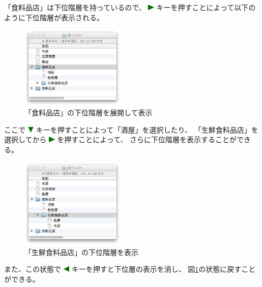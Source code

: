 \documentclass[twoside]{wiss}
\def\figwidth{50mm}
\def\downtriangle{ \includegraphics[width=3mm,bb=0 0 36 36]{figures/downtriangle.pdf} }
\def\righttriangle{ \includegraphics[width=3mm,bb=0 0 36 36]{figures/righttriangle.pdf} }
\def\lefttriangle{ \includegraphics[width=3mm,bb=0 0 36 36]{figures/lefttriangle.pdf} }
\begin{document}
\noindent
「食料品店」は下位階層を持っているので、
{\righttriangle}キーを押すことによって以下のように下位階層が表示される。

\begin{figure}[H]
\centerline{\includegraphics[width=\figwidth,bb=0 0 344 272]{figures/51d867d4721f65c18e84172c8818e137.png}}
\caption{「食料品店」の下位階層を展開して表示}
\label{screenshot5}
\end{figure}

\noindent
ここで{\downtriangle}キーを押すことによって「酒屋」を選択したり、
「生鮮食料品店」を選択してから{\righttriangle}を押すことによって、
さらに下位階層を表示することができる。

\begin{figure}[H]
\centerline{\includegraphics[width=\figwidth,bb=0 0 344 298]{figures/ce3ee682612de44d6c663a7323c262a6.png}}
\caption{「生鮮食料品店」の下位階層を表示}
\label{screenshot6}
\end{figure}

\noindent
また、この状態で{\lefttriangle}キーを押すと下位層の表示を消し、
図\ref{screenshot5}の状態に戻すことができる。
\end{document}
